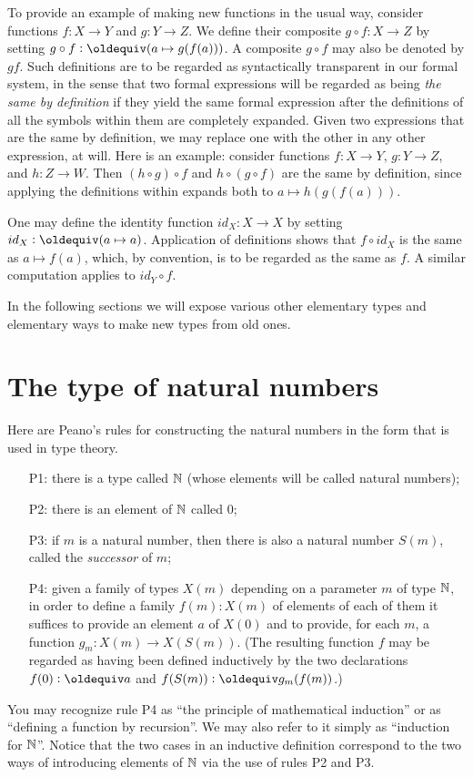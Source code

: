 To provide an example of making new functions in the usual way, consider functions $f : X \to Y$ and $g : Y \to Z$.  We define their composite
$g \circ f : X \to Z$ by setting $g \circ f \defeq (a \mapsto g(f(a)))$. 
A composite $g \circ f$ may also be denoted by $gf$.
Such definitions are to be regarded as syntactically transparent in
our formal system, in the sense that two formal expressions will be regarded as being \emph{the same by definition} if they yield the same formal
expression after the definitions of all the symbols within them are completely expanded.  Given two expressions that are the same by definition,
we may replace one with the other in any other expression, at will.  Here is an example: consider functions $f : X \to Y$, $g : Y \to Z$, and $h
: Z \to W$.  Then $(h \circ g) \circ f$ and $h \circ (g \circ f)$ are the same by definition, since applying the definitions within expands both
to $a \mapsto h(g(f(a)))$.

One may define the identity function $id_X : X \to X$ by setting $id_X \defeq (a \mapsto a)$.  Application of definitions shows that $f \circ
id_X$ is the same as $a \mapsto f(a)$, which, by convention, is to be regarded as the same as $f$.  A similar computation applies to $id_Y \circ
f$.

In the following sections we will expose various other elementary types and elementary ways to make new types from old ones.

\section{The type of natural numbers}
\label{sec:natural-numbers}

Here are Peano's rules \citep{peano-principia} for constructing the natural numbers in the form that is used in type theory.
\begin{enumerate}
\item[P1:] there is a type called $\mathbb{N}$ (whose elements will be called natural numbers);
\item[P2:] there is an element of $\mathbb{N}$ called $0$;
\item[P3:] if $m$ is a natural number, then there is also a natural number $S(m)$, called the \emph{successor} of $m$;
\item[P4:] given a family of types $X(m)$ depending on a parameter
  $m$ of type $\mathbb{N}$, in order to define a family $f(m) : X(m)$ of elements of each of them it suffices to provide an element $a$ of $X(0)$ and
  to provide, for each $m$, a function $g_m : X(m) \to X(S(m))$.  (The resulting function $f$ may be regarded as having been defined inductively
  by the two declarations $f(0) \defeq a$ and $f(S(m)) \defeq g_m(f(m))$.)
\end{enumerate}
\nopagebreak
You may recognize rule P4 as ``the principle of mathematical induction'' or as ``defining a function by recursion''.  We may also refer to it
simply as ``induction for $\mathbb{N}$''.  Notice that the two cases in an inductive definition correspond to the two ways of introducing elements of
$\mathbb{N}$ via the use of rules P2 and P3.

